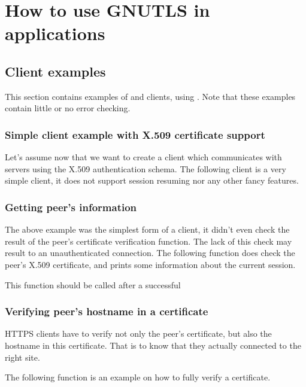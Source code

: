 \chapter{How to use GNUTLS in applications}
\label{examples}

\section{Client examples}
This section contains examples of \tls{} and \ssl{} clients, using \gnutls{}. 
Note that these examples contain little or no error checking.

\subsection{Simple client example with X.509 certificate support}
Let's assume now that we want to create a client which communicates
with servers using the X.509 authentication schema. The following client
is a very simple \tls{} client, it does not support session resuming nor
any other fancy features.


\subsection{Getting peer's information}
\par The above example was the simplest form of a client, it didn't even check
the result of the peer's certificate verification function. The lack of
this check may result to an unauthenticated connection.
The following function does check the peer's
X.509 certificate, and prints some information about the current session.
\par
This function should be called after a successful



\subsection{Verifying peer's hostname in a certificate}
\par HTTPS clients have to verify not only the peer's certificate,
but also the hostname in this certificate. That is to know that
they actually connected to the right site.

\par
The following function is an example on how to fully verify a certificate.

